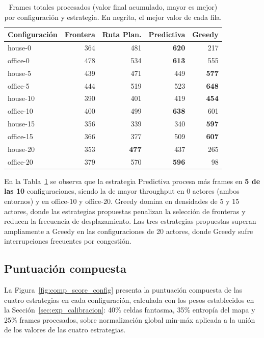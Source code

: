 \begin{table}[htbp]
    \centering
    \caption{Frames totales procesados (valor final acumulado, mayor es mejor) por configuración y estrategia. En negrita, el mejor valor de cada fila.}%
    \label{tab:comp_frames}
    \begin{tabular}{lrrrr}
        \toprule
        \textbf{Configuración} & \textbf{Frontera} & \textbf{Ruta Plan.} & \textbf{Predictiva} & \textbf{Greedy} \\
        \midrule
        house-0   & 364 & 481 & \textbf{620} & 217 \\
        office-0  & 478 & 534 & \textbf{613} & 555 \\
        house-5   & 439 & 471 & 449 & \textbf{577} \\
        office-5  & 444 & 519 & 523 & \textbf{648} \\
        house-10  & 390 & 401 & 419 & \textbf{454} \\
        office-10 & 400 & 499 & \textbf{638} & 601 \\
        house-15  & 356 & 339 & 340 & \textbf{597} \\
        office-15 & 366 & 377 & 509 & \textbf{607} \\
        house-20  & 353 & \textbf{477} & 437 & 265 \\
        office-20 & 379 & 570 & \textbf{596} & 98  \\
        \bottomrule
    \end{tabular}
\end{table}

En la Tabla~\ref{tab:comp_frames} se observa que la estrategia Predictiva procesa más frames en \textbf{5 de las 10} configuraciones, siendo la de mayor throughput en 0 actores (ambos entornos) y en office-10 y office-20. Greedy domina en densidades de 5 y 15 actores, donde las estrategias propuestas penalizan la selección de fronteras y reducen la frecuencia de desplazamiento. Las tres estrategias propuestas superan ampliamente a Greedy en las configuraciones de 20 actores, donde Greedy sufre interrupciones frecuentes por congestión.

\subsection{Puntuación compuesta}

La Figura~\ref{fig:comp_score_config} presenta la puntuación compuesta de las cuatro estrategias en cada configuración, calculada con los pesos establecidos en la Sección~\ref{sec:exp_calibracion}: 40\% celdas fantasma, 35\% entropía del mapa y 25\% frames procesados, sobre normalización global min-máx aplicada a la unión de los valores de las cuatro estrategias.

